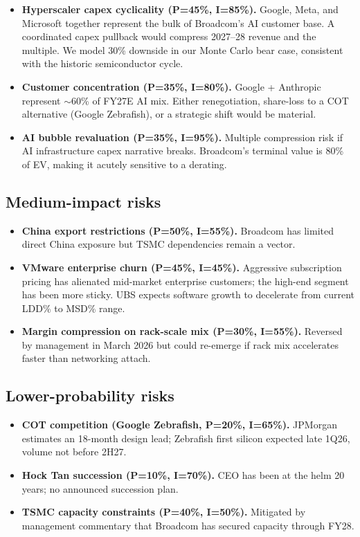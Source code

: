 \documentclass[10pt,letterpaper]{article}
\begin{document}
\begin{itemize}[leftmargin=*]
\item \textbf{Hyperscaler capex cyclicality (P=45\%, I=85\%).} Google, Meta, and Microsoft together represent the bulk of Broadcom's AI customer base. A coordinated capex pullback would compress 2027--28 revenue and the multiple. We model 30\% downside in our Monte Carlo bear case, consistent with the historic semiconductor cycle.
\item \textbf{Customer concentration (P=35\%, I=80\%).} Google + Anthropic represent $\sim$60\% of FY27E AI mix. Either renegotiation, share-loss to a COT alternative (Google Zebrafish), or a strategic shift would be material.
\item \textbf{AI bubble revaluation (P=35\%, I=95\%).} Multiple compression risk if AI infrastructure capex narrative breaks. Broadcom's terminal value is 80\% of EV, making it acutely sensitive to a derating.
\end{itemize}

\subsection{Medium-impact risks}

\begin{itemize}[leftmargin=*]
\item \textbf{China export restrictions (P=50\%, I=55\%).} Broadcom has limited direct China exposure but TSMC dependencies remain a vector.
\item \textbf{VMware enterprise churn (P=45\%, I=45\%).} Aggressive subscription pricing has alienated mid-market enterprise customers; the high-end segment has been more sticky. UBS expects software growth to decelerate from current LDD\% to MSD\% range.
\item \textbf{Margin compression on rack-scale mix (P=30\%, I=55\%).} Reversed by management in March 2026 but could re-emerge if rack mix accelerates faster than networking attach.
\end{itemize}

\subsection{Lower-probability risks}

\begin{itemize}[leftmargin=*]
\item \textbf{COT competition (Google Zebrafish, P=20\%, I=65\%).} JPMorgan estimates an 18-month design lead; Zebrafish first silicon expected late 1Q26, volume not before 2H27.
\item \textbf{Hock Tan succession (P=10\%, I=70\%).} CEO has been at the helm 20 years; no announced succession plan.
\item \textbf{TSMC capacity constraints (P=40\%, I=50\%).} Mitigated by management commentary that Broadcom has secured capacity through FY28.
\end{itemize}
\end{document}
